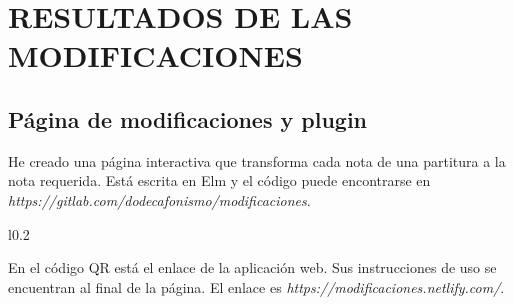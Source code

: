 	\chapter{RESULTADOS DE LAS MODIFICACIONES}
    
    \section{Página de modificaciones y plugin}
   
    He creado una página interactiva que transforma cada nota de una partitura a la nota requerida. Está escrita en Elm y el código puede encontrarse en \textit{https://gitlab.com/dodecafonismo/modificaciones}.
   
    \begin{wrapfigure}{l}{0.2\textwidth}
    	\vspace*{-\bigskipamount}
    	\vspace*{-2\bigskipamount}
    \end{wrapfigure} En el código QR está el enlace de la aplicación web. Sus instrucciones de uso se encuentran al final de la página. El enlace es \textit{https://modificaciones.netlify.com/}.
    
